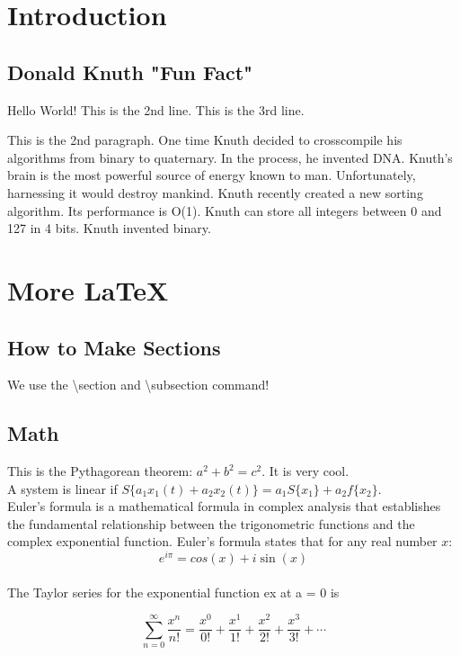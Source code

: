 \documentclass{article}
\begin{document}
  \tableofcontents

  \section{Introduction}
  \subsection{Donald Knuth "Fun Fact"}
  Hello World!
  This is the 2nd line.
  This is the 3rd line.

  This is the 2nd paragraph. One time Knuth decided to crosscompile his
  algorithms from binary to quaternary. In the process, he invented DNA.
  Knuth's brain is the most powerful source of energy known to man.
  Unfortunately, harnessing it would destroy mankind. Knuth recently created
  a new sorting algorithm. Its performance is O(1). Knuth can store all
  integers between 0 and 127 in 4 bits. Knuth invented binary.

  \section{More \LaTeX}
  \subsection{How to Make Sections}
  We use the \textbackslash section and \textbackslash subsection command!


  \subsection{Math}
  This is the Pythagorean theorem: $a^2+ b^2 = c^2$. It is very cool.
  \\

  A system is linear if $S\{a_1x_1(t)+a_2x_2(t)\} = a_1S\{x_1\}+a_2f\{x_2\}$.
  \\

  Euler's formula is a mathematical formula in complex analysis that
  establishes the fundamental relationship between the trigonometric
  functions and the complex exponential function. Euler's formula states that
  for any real number $x$: 
  \[e^{i\pi} = cos(x) + i\sin(x)\]
  \\

  The Taylor series for the exponential function ex at a = 0 is

  \[
      \sum_{n=0}^\infty \frac{x^n}{n!} 
      = \frac{x^0}{0!}+\frac{x^1}{1!} + \frac{x^2}{2!} + \frac{x^3}{3!} 
      + \cdots
  \]
\end{document}

